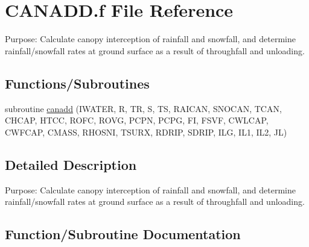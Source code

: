 \hypertarget{CANADD_8f}{}\section{C\+A\+N\+A\+D\+D.\+f File Reference}
\label{CANADD_8f}


Purpose\+: Calculate canopy interception of rainfall and snowfall, and determine rainfall/snowfall rates at ground surface as a result of throughfall and unloading.  


\subsection*{Functions/\+Subroutines}
\begin{DoxyCompactItemize}
\item 
subroutine \hyperlink{CANADD_8f_ae4481b561c2022da57ec7a4dacf6a9df}{canadd} (I\+W\+A\+T\+E\+R, R, T\+R, S, T\+S, R\+A\+I\+C\+A\+N, S\+N\+O\+C\+A\+N, T\+C\+A\+N, C\+H\+C\+A\+P, H\+T\+C\+C, R\+O\+F\+C, R\+O\+V\+G, P\+C\+P\+N, P\+C\+P\+G, F\+I, F\+S\+V\+F, C\+W\+L\+C\+A\+P, C\+W\+F\+C\+A\+P, C\+M\+A\+S\+S, R\+H\+O\+S\+N\+I, T\+S\+U\+R\+X, R\+D\+R\+I\+P, S\+D\+R\+I\+P, I\+L\+G, I\+L1, I\+L2, J\+L)
\end{DoxyCompactItemize}


\subsection{Detailed Description}
Purpose\+: Calculate canopy interception of rainfall and snowfall, and determine rainfall/snowfall rates at ground surface as a result of throughfall and unloading. 



\subsection{Function/\+Subroutine Documentation}
\hypertarget{CANADD_8f_ae4481b561c2022da57ec7a4dacf6a9df}{}
